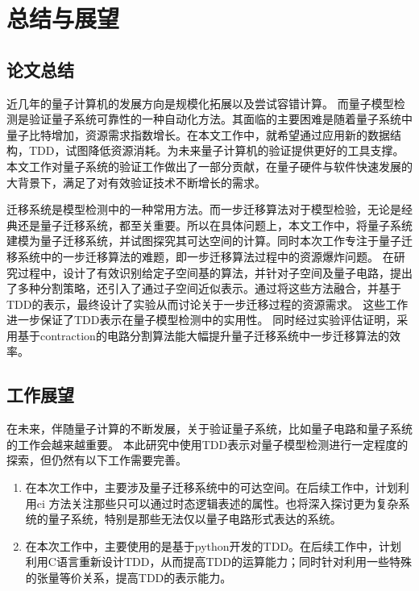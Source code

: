 \chapter{总结与展望}
\section{论文总结}

近几年的量子计算机的发展方向是规模化拓展以及尝试容错计算。
而量子模型检测是验证量子系统可靠性的一种自动化方法。其面临的主要困难是随着量子系统中量子比特增加，资源需求指数增长。在本文工作中，就希望通过应用新的数据结构，TDD，试图降低资源消耗。为未来量子计算机的验证提供更好的工具支撑。
本文工作对量子系统的验证工作做出了一部分贡献，在量子硬件与软件快速发展的大背景下，满足了对有效验证技术不断增长的需求。

迁移系统是模型检测中的一种常用方法。而一步迁移算法对于模型检验，无论是经典还是量子迁移系统，都至关重要。所以在具体问题上，本文工作中，将量子系统建模为量子迁移系统，并试图探究其可达空间的计算。同时本次工作专注于量子迁移系统中的一步迁移算法的难题，即一步迁移算法过程中的资源爆炸问题。
在研究过程中，设计了有效识别给定子空间基的算法，并针对子空间及量子电路，提出了多种分割策略，还引入了通过子空间近似表示。通过将这些方法融合，并基于TDD的表示，最终设计了实验从而讨论关于一步迁移过程的资源需求。
这些工作进一步保证了TDD表示在量子模型检测中的实用性。
同时经过实验评估证明，采用基于contraction的电路分割算法能大幅提升量子迁移系统中一步迁移算法的效率。


\section{工作展望}

在未来，伴随量子计算的不断发展，关于验证量子系统，比如量子电路和量子系统的工作会越来越重要。
本此研究中使用TDD表示对量子模型检测进行一定程度的探索，但仍然有以下工作需要完善。
\begin{enumerate}
    \item 在本次工作中，主要涉及量子迁移系统中的可达空间。在后续工作中，计划利用ci 方法关注那些只可以通过时态逻辑表述的属性。也将深入探讨更为复杂系统的量子系统，特别是那些无法仅以量子电路形式表达的系统。
    \item 在本次工作中，主要使用的是基于python开发的TDD。在后续工作中，计划利用C语言重新设计TDD，从而提高TDD的运算能力；同时针对利用一些特殊的张量等价关系，提高TDD的表示能力。
\end{enumerate}

